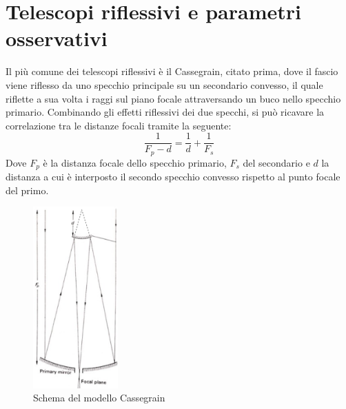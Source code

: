 
\section{Telescopi riflessivi e parametri osservativi}
\label{sec:telescopi-riflessivi-parametri}

Il più comune dei telescopi riflessivi è il Cassegrain, citato prima, dove il fascio viene riflesso da uno specchio principale su un secondario convesso, il quale riflette a sua volta i raggi sul piano focale attraversando un buco nello specchio primario. Combinando gli effetti riflessivi dei due specchi, si può ricavare la correlazione tra le distanze focali tramite la seguente:
\begin{equation*}
	\frac{1}{F_p-d}=\frac{1}{d}+\frac{1}{F_s}
\end{equation*}
Dove $F_p$ è la distanza focale dello specchio primario, $F_s$ del secondario e $d$ la distanza a cui è interposto il secondo specchio convesso rispetto al punto focale del primo.

\begin{figure}
	\vspace{-10pt}
	\centering
	\includegraphics[width=0.29\textwidth]{Immagini/Capitolo2/Cassegrain.PNG}
	\caption{Schema del modello Cassegrain}
	\vspace{-30pt}
\end{figure}


